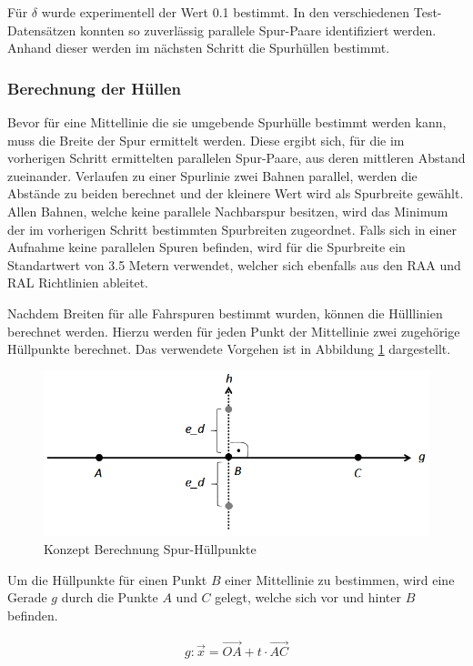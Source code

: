 Für $\delta$ wurde experimentell der Wert 0.1 bestimmt. In den verschiedenen Test-Datensätzen konnten
so zuverlässig parallele Spur-Paare identifiziert werden. Anhand dieser werden im nächsten Schritt
die Spurhüllen bestimmt.

\subsubsection{Berechnung der Hüllen}
\label{sec:real2_create_envelopes}

Bevor für eine Mittellinie die sie umgebende Spurhülle bestimmt werden kann, muss die Breite der Spur
ermittelt werden. Diese ergibt sich, für die im vorherigen Schritt ermittelten parallelen Spur-Paare, aus
deren mittleren Abstand zueinander. Verlaufen zu einer Spurlinie zwei Bahnen parallel, werden
die Abstände zu beiden berechnet und der kleinere Wert wird als Spurbreite gewählt.
Allen Bahnen, welche keine parallele Nachbarspur besitzen, wird das Minimum der im vorherigen Schritt
bestimmten Spurbreiten zugeordnet.
Falls sich in einer Aufnahme keine parallelen Spuren befinden, wird für die Spurbreite ein Standartwert
von 3.5 Metern verwendet, welcher sich ebenfalls aus den RAA und RAL Richtlinien ableitet.

Nachdem Breiten für alle Fahrspuren bestimmt wurden, können die Hülllinien berechnet werden.
Hierzu werden für jeden Punkt der Mittellinie zwei zugehörige Hüllpunkte berechnet.
Das verwendete Vorgehen ist in Abbildung \ref{fig:real2_envelope_point_calculation_concept} dargestellt.

\begin{figure}[H]
    \centering
    \includegraphics[width=0.5\linewidth]{resources/img/umsetzung/U2/calc_env_point}
    \caption{Konzept Berechnung Spur-Hüllpunkte}
    \label{fig:real2_envelope_point_calculation_concept}
\end{figure}

Um die Hüllpunkte für einen Punkt $B$ einer Mittellinie zu bestimmen, wird eine Gerade $g$ durch die
Punkte $A$ und $C$ gelegt, welche sich vor und hinter $B$ befinden.

\begin{ceqn}
\begin{align}
    g: \vec{x} = \overrightarrow{OA} + t \cdot \overrightarrow{AC}
\end{align}
\end{ceqn}

